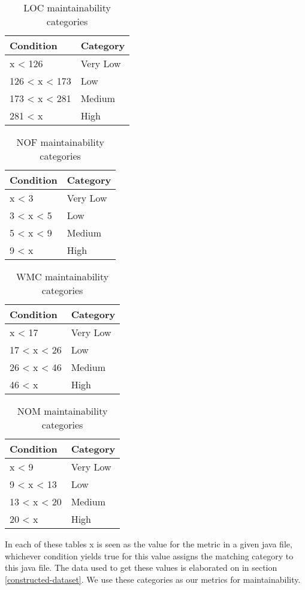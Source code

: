 \begin{table}[!ht]
    \centering
    \label{categories-LOC}
    \begin{tabular}{|l|l|}
        \hline
        \textbf{Condition} & \textbf{Category} \\
        \hline
        x < 126 & Very Low \\
        126 < x < 173 & Low \\
        173 < x < 281 & Medium \\
        281 < x & High \\
        \hline
    \end{tabular}
    \caption{LOC maintainability categories}
\end{table}
\begin{table}[!ht]
    \centering
    \label{categories-NOF}
    \begin{tabular}{|l|l|}
        \hline
        \textbf{Condition} & \textbf{Category} \\
        \hline
        x < 3 & Very Low \\
        3 < x < 5 & Low \\
        5 < x < 9 & Medium \\
        9 < x & High \\
        \hline
    \end{tabular}
    \caption{NOF maintainability categories}
\end{table}
\begin{table}[!ht]
    \centering
    \label{categories-WMC}
    \begin{tabular}{|l|l|}
        \hline
        \textbf{Condition} & \textbf{Category} \\
        \hline
        x < 17 & Very Low \\
        17 < x < 26 & Low \\
        26 < x < 46 & Medium \\
        46 < x & High \\
        \hline
    \end{tabular}
    \caption{WMC maintainability categories}
\end{table}
\begin{table}[!ht]
    \centering
    \label{categories-NOM}
    \begin{tabular}{|l|l|}
        \hline
        \textbf{Condition} & \textbf{Category} \\
        \hline
        x < 9 & Very Low \\
        9 < x < 13 & Low \\
        13 < x < 20 & Medium \\
        20 < x & High \\
        \hline
    \end{tabular}
    \caption{NOM maintainability categories}
\end{table}
In each of these tables x is seen as the value for the metric in a given java file, whichever condition yields true for this value assigns the matching category to this java file. The data used to get these values is elaborated on in section \ref{constructed-dataset}. We use these categories as our metrics for maintainability.

